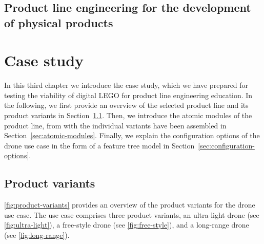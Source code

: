 \documentclass[sigconf,review]{acmart}
\begin{document}
\subsection{Product line engineering for the development of physical products}
\label{sec:modualarity}






\section{Case study}
\label{sec:case-study}

In this third chapter we introduce the case study, which we have prepared for testing the viability of digital LEGO for product line engineering education.
In the following, we first provide an overview of the selected product line and its product variants in Section~\ref{sec:product-variants}.
Then, we introduce the atomic modules of the product line, from with the individual variants have been assembled in Section~\ref{sec:atomic-modules}.
Finally, we explain the configuration options of the drone use case in the form of a feature tree model in Section~\ref{sec:configuration-options}.

\subsection{Product variants}
\label{sec:product-variants}

\cref{fig:product-variants} provides an overview of the product variants for the drone use case.
The use case comprises three product variants, an ultra-light drone (see \cref{fig:ultra-light}), a free-style drone (see \cref{fig:free-style}), and a long-range drone (see \cref{fig:long-range}).

\end{document}
